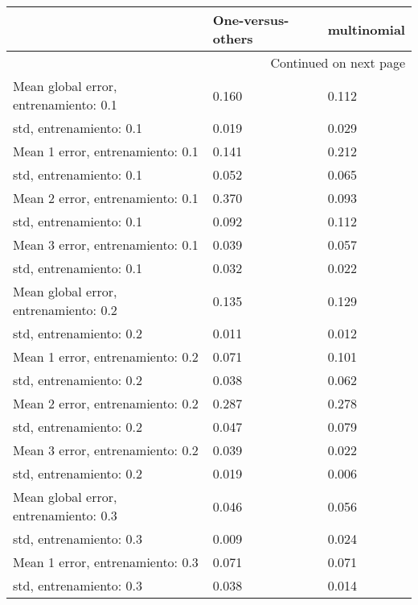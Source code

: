\begin{longtable}{p{4cm}|p{1.5cm}|p{1.5cm}}
\toprule
{} &  One-versus-others &  multinomial \\
\midrule
\endhead
\midrule
\multicolumn{3}{r}{{Continued on next page}} \\
\midrule
\endfoot

\bottomrule
\endlastfoot
Mean global error, entrenamiento: 0.1 &              0.160 &        0.112 \\
std, entrenamiento: 0.1               &              0.019 &        0.029 \\
Mean 1 error, entrenamiento: 0.1      &              0.141 &        0.212 \\
std, entrenamiento: 0.1               &              0.052 &        0.065 \\
Mean 2 error, entrenamiento: 0.1      &              0.370 &        0.093 \\
std, entrenamiento: 0.1               &              0.092 &        0.112 \\
Mean 3 error, entrenamiento: 0.1      &              0.039 &        0.057 \\
std, entrenamiento: 0.1               &              0.032 &        0.022 \\
Mean global error, entrenamiento: 0.2 &              0.135 &        0.129 \\
std, entrenamiento: 0.2               &              0.011 &        0.012 \\
Mean 1 error, entrenamiento: 0.2      &              0.071 &        0.101 \\
std, entrenamiento: 0.2               &              0.038 &        0.062 \\
Mean 2 error, entrenamiento: 0.2      &              0.287 &        0.278 \\
std, entrenamiento: 0.2               &              0.047 &        0.079 \\
Mean 3 error, entrenamiento: 0.2      &              0.039 &        0.022 \\
std, entrenamiento: 0.2               &              0.019 &        0.006 \\
Mean global error, entrenamiento: 0.3 &              0.046 &        0.056 \\
std, entrenamiento: 0.3               &              0.009 &        0.024 \\
Mean 1 error, entrenamiento: 0.3      &              0.071 &        0.071 \\
std, entrenamiento: 0.3               &              0.038 &        0.014 \\

\end{longtable}
